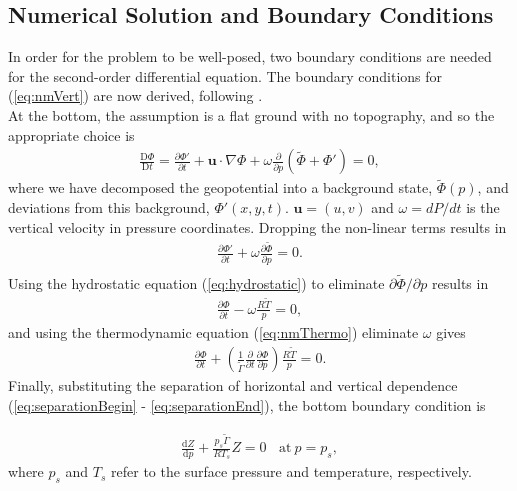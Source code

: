 \subsection{Numerical Solution and Boundary Conditions}
\label{sec:normalModes}
In order for the problem to be well-posed, two boundary conditions are needed for the second-order differential equation. The boundary conditions for (\ref{eq:nmVert}) are now derived, following \cite{Daley1991}.\\

At the bottom, the assumption is a flat ground with no topography, and so the appropriate choice is 
\begin{align}
\frac{\text{D} \Phi}{\text{D} t}  = \frac{\partial \Phi'}{\partial t} + \mathbf{u} \cdot \nabla \Phi + \omega \frac{\partial}{\partial p} (\tilde{\Phi} + \Phi') = 0,
\end{align}
where we have decomposed the geopotential into a background state, $\tilde{\Phi}(p)$, and deviations from this background, $\Phi'(x,y,t)$. $\mathbf{u} = (u,v)$ and $\omega = dP/dt$ is the vertical velocity in pressure coordinates. Dropping the non-linear terms results in
\begin{align}
\frac{\partial \Phi'}{\partial t} + \omega \frac{\partial \tilde{\Phi}}{\partial p} = 0.\\
\end{align}
Using the hydrostatic equation (\ref{eq:hydrostatic}) to eliminate $\partial \tilde{\Phi}/\partial p$ results in
\begin{align}
\frac{\partial \Phi}{\partial t}  - \omega \frac{R\tilde{T}}{p} = 0,
\end{align}
and using the thermodynamic equation (\ref{eq:nmThermo}) eliminate $\omega$ gives
\begin{align}
\frac{\partial \Phi}{\partial t}  + \left(\frac{1}{\tilde{\Gamma}} \frac{\partial}{\partial t} \frac{\partial \Phi}{\partial p}\right) \frac{R\tilde{T}}{p} = 0.
\end{align}
Finally, substituting the separation of horizontal and vertical dependence (\ref{eq:separationBegin} - \ref{eq:separationEnd}), the bottom boundary condition is 

\begin{align}
\frac{\text{d}Z}{\text{d}p} + \frac{p_s\tilde{\Gamma}}{RT_s} Z = 0 ~~~~\text{at}~ p = p_s,\label{eq:BCbot}
\end{align}
where $p_s$ and $T_s$ refer to the surface pressure and temperature, respectively.\\

